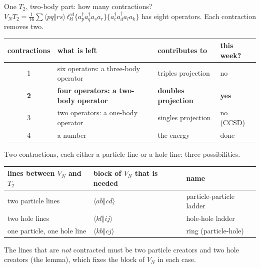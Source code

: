\documentclass[aspectratio=169,10pt]{beamer}
\newcommand{\cre}[1]{a_{#1}^{\dagger}}
\newcommand{\ann}[1]{a_{#1}}
\newcommand{\no}[1]{\bigl\{#1\bigr\}}
\newcommand{\as}[4]{\langle #1#2\Vert #3#4\rangle}
\begin{document}
\begin{frame}[shrink=3]{One $T_2$, two-body part: how many contractions?}
\small
$V_NT_2=\tfrac1{16}\sum\as pqrs\,t_{kl}^{cd}\no{\cre p\cre q\ann s\ann r}\no{\cre c\cre d\ann l\ann k}$ has eight operators. Each contraction removes two.
\begin{center}
\renewcommand{\arraystretch}{1.3}
\begin{tabular}{clll}
\toprule
contractions & what is left & contributes to & this week?\\
\midrule
1 & six operators: a three-body operator & triples projection & no\\
\textbf{2} & \textbf{four operators: a two-body operator} & \textbf{doubles projection} & \textbf{yes}\\
3 & two operators: a one-body operator & singles projection & no (CCSD)\\
4 & a number & the energy & done\\
\bottomrule
\end{tabular}
\end{center}
Two contractions, each either a particle line or a hole line: three possibilities.
\begin{center}
\renewcommand{\arraystretch}{1.2}
\begin{tabular}{lll}
\toprule
lines between $V_N$ and $T_2$ & block of $V_N$ that is needed & name\\
\midrule
two particle lines & $\as abcd$ & particle-particle ladder\\
two hole lines & $\as klij$ & hole-hole ladder\\
one particle, one hole line & $\as kbcj$ & ring (particle-hole)\\
\bottomrule
\end{tabular}
\end{center}
The lines that are \emph{not} contracted must be two particle creators and two hole creators (the lemma), which fixes the block of $V_N$ in each case.
\end{frame}
\end{document}
